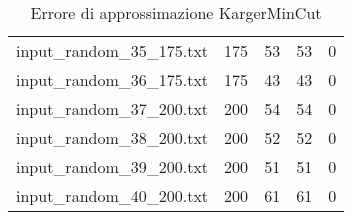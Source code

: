 \begin{table}[H]
\begin{tabular}{lrrrr}
     input\_random\_35\_175.txt &     175 &        53 &                 53 &               0 \\
     input\_random\_36\_175.txt &     175 &        43 &                 43 &               0 \\
     input\_random\_37\_200.txt &     200 &        54 &                 54 &               0 \\
     input\_random\_38\_200.txt &     200 &        52 &                 52 &               0 \\
     input\_random\_39\_200.txt &     200 &        51 &                 51 &               0 \\
     input\_random\_40\_200.txt &     200 &        61 &                 61 &               0 \\
     \hline
    \end{tabular}

    \caption{Errore di approssimazione KargerMinCut}
    \label{table:karger-approx-error}
\end{table}

